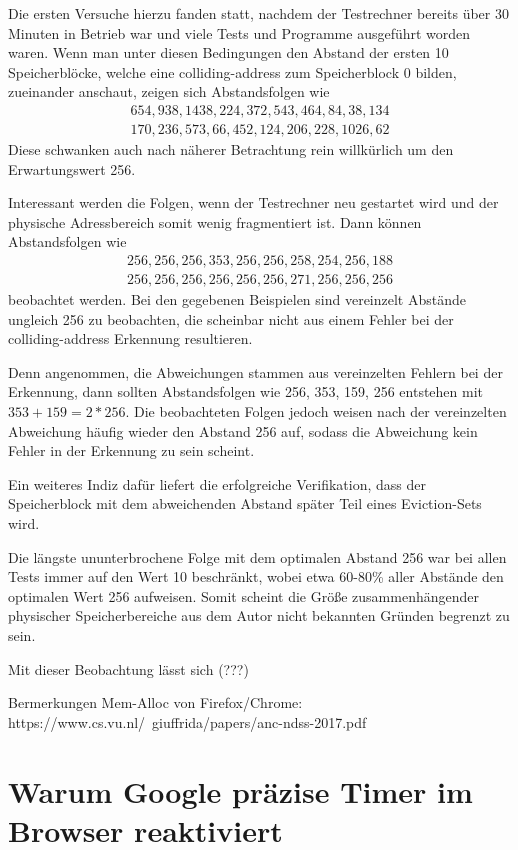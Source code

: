 Die ersten Versuche hierzu fanden statt, nachdem der Testrechner bereits über 30 Minuten in Betrieb war und viele Tests und Programme ausgeführt worden waren.
Wenn man unter diesen Bedingungen den Abstand der ersten 10 Speicherblöcke, welche eine colliding-address zum Speicherblock 0 bilden, zueinander anschaut, zeigen sich Abstandsfolgen wie 
\begin{align*} 
654, 938, 1438, 224, 372, 543, 464, 84, 38, 134\\
170, 236, 573, 66, 452, 124, 206, 228, 1026, 62
\end{align*}
Diese schwanken auch nach näherer Betrachtung rein willkürlich um den Erwartungswert 256.

Interessant werden die Folgen, wenn der Testrechner neu gestartet wird und der physische Adressbereich somit wenig fragmentiert ist.
Dann können Abstandsfolgen wie 
\begin{align*} 
256, 256, 256, 353, 256, 256, 258, 254, 256, 188\\
256, 256, 256, 256, 256, 256, 271, 256, 256, 256
\end{align*}
beobachtet werden.
Bei den gegebenen Beispielen sind vereinzelt Abstände ungleich 256 zu beobachten, die scheinbar nicht aus einem Fehler bei der colliding-address Erkennung resultieren.

Denn angenommen, die Abweichungen stammen aus vereinzelten Fehlern bei der Erkennung, dann sollten Abstandsfolgen wie 256, 353, 159, 256 entstehen mit $353+159=2*256$.
Die beobachteten Folgen jedoch weisen nach der vereinzelten Abweichung häufig wieder den Abstand 256 auf, sodass die Abweichung kein Fehler in der Erkennung zu sein scheint.

Ein weiteres Indiz dafür liefert die erfolgreiche Verifikation, dass der Speicherblock mit dem abweichenden Abstand später Teil eines Eviction-Sets wird.

Die längste ununterbrochene Folge mit dem optimalen Abstand 256 war bei allen Tests immer auf den Wert 10 beschränkt, wobei etwa 60-80\% aller Abstände den optimalen Wert 256 aufweisen.
Somit scheint die Größe zusammenhängender physischer Speicherbereiche aus dem Autor nicht bekannten Gründen begrenzt zu sein.

Mit dieser Beobachtung lässt sich (???)

Bermerkungen Mem-Alloc von Firefox/Chrome: https://www.cs.vu.nl/~giuffrida/papers/anc-ndss-2017.pdf
\cite{ASLROnTheLine}

\section{Warum Google präzise Timer im Browser reaktiviert}
\label{GooglePageIsolation}

